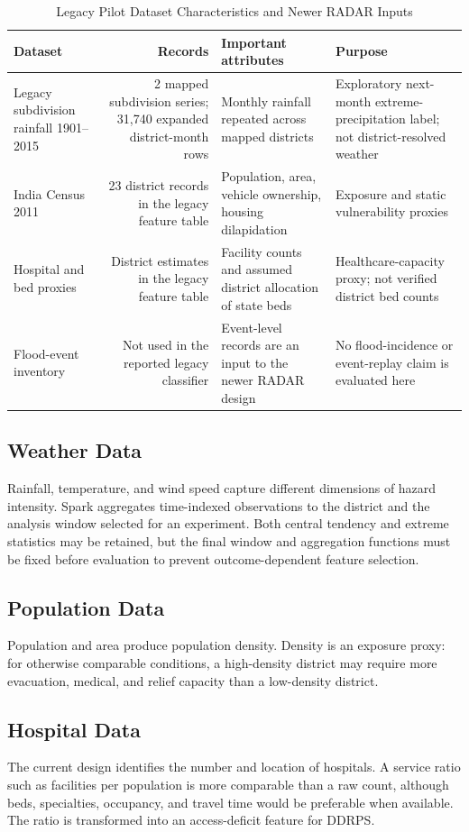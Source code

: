 \documentclass[conference]{IEEEtran}
\begin{document}
\begin{table}[t]
\caption{Legacy Pilot Dataset Characteristics and Newer RADAR Inputs}
\label{tab:datasets}
\centering
\small
\begin{tabularx}{\textwidth}{@{}l r Y Y@{}}
\toprule
Dataset & Records & Important attributes & Purpose \\
\midrule
Legacy subdivision rainfall 1901--2015 & 2 mapped subdivision series; 31,740 expanded district-month rows & Monthly rainfall repeated across mapped districts & Exploratory next-month extreme-precipitation label; not district-resolved weather \\
India Census 2011 & 23 district records in the legacy feature table & Population, area, vehicle ownership, housing dilapidation & Exposure and static vulnerability proxies \\
Hospital and bed proxies & District estimates in the legacy feature table & Facility counts and assumed district allocation of state beds & Healthcare-capacity proxy; not verified district bed counts \\
Flood-event inventory & Not used in the reported legacy classifier & Event-level records are an input to the newer RADAR design & No flood-incidence or event-replay claim is evaluated here \\
\bottomrule
\end{tabularx}
\end{table}

\subsection{Weather Data}
Rainfall, temperature, and wind speed capture different dimensions of hazard
intensity. Spark aggregates time-indexed observations to the district and the
analysis window selected for an experiment. Both central tendency and extreme
statistics may be retained, but the final window and aggregation functions must
be fixed before evaluation to prevent outcome-dependent feature selection.

\subsection{Population Data}
Population and area produce population density. Density is an exposure proxy:
for otherwise comparable conditions, a high-density district may require more
evacuation, medical, and relief capacity than a low-density district.

\subsection{Hospital Data}
The current design identifies the number and location of hospitals. A service
ratio such as facilities per population is more comparable than a raw count,
although beds, specialties, occupancy, and travel time would be preferable when
available. The ratio is transformed into an access-deficit feature for DDRPS.
\end{document}
